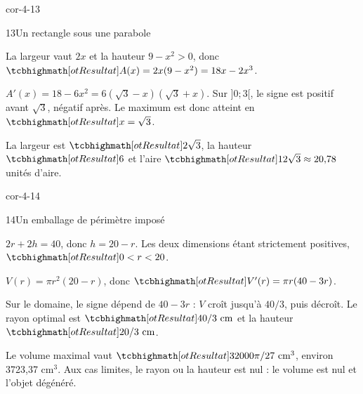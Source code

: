 \begin{blocLivre}{cor-4-13}
\begin{corrige}{13}{Un rectangle sous une parabole}
\begin{questions}
\item La largeur vaut $2x$ et la hauteur $9-x^2>0$, donc
$\res{A(x)=2x(9-x^2)=18x-2x^3}$.
\item $A'(x)=18-6x^2=6(\sqrt3-x)(\sqrt3+x)$.
Sur $]0;3[$, le signe est positif avant $\sqrt3$, négatif après.
Le maximum est donc atteint en $\res{x=\sqrt3}$.
\item La largeur est $\res{2\sqrt3}$, la hauteur $\res{6}$ et l'aire
$\res{12\sqrt3\approx20{,}78}$ unités d'aire.
\end{questions}
\begin{center}\end{center}
\label{figlivre-r04-13-var-cor}

\end{corrige}
\end{blocLivre}
\begin{blocLivre}{cor-4-14}
\begin{corrige}{14}{Un emballage de périmètre imposé}
\begin{questions}
\item $2r+2h=40$, donc $h=20-r$. Les deux dimensions étant strictement positives,
$\res{0<r<20}$.
\item $V(r)=\pi r^2(20-r)$, donc $\res{V'(r)=\pi r(40-3r)}$.
\item Sur le domaine, le signe dépend de $40-3r$ : $V$ croît jusqu'à $40/3$,
puis décroît. Le rayon optimal est $\res{40/3\text{ cm}}$ et la hauteur $\res{20/3\text{ cm}}$.
\item Le volume maximal vaut $\res{32000\pi/27\text{ cm}^3}$, environ 3723,37 cm$^3$.
Aux cas limites, le rayon ou la hauteur est nul : le volume est nul et l'objet dégénéré.
\end{questions}
\label{figlivre-r04-14-var-cor}

\label{figlivre-r04-14-cylindre-cor}

\end{corrige}
\end{blocLivre}
